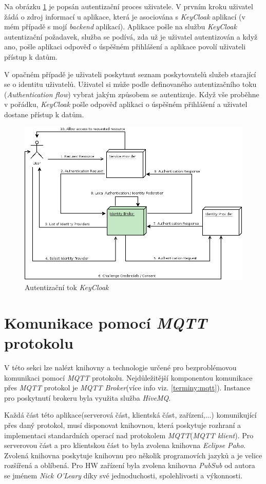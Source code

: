 Na obrázku \ref{figure:keycloak_flow} je popsán autentizační proces uživatele. V prvním kroku uživatel žádá o zdroj informací u aplikace, která je asociována s \emph{KeyCloak} aplikací (v mém případě s mojí \emph{backend} aplikací).
Aplikace pošle na službu \emph{KeyCloak} autentizační požadavek, služba se podívá, zda už je uživatel autentizován a když ano, pošle aplikaci odpověď o úspěšném přihlášení a aplikace povolí uživateli přístup k datům.

V opačném případě je uživateli poskytnut seznam poskytovatelů služeb starající se o identitu uživatelů.
Uživatel si může podle definovaného autentizačního toku (\emph{Authentication flow}) vybrat jakým způsobem se autentizuje. Když vše proběhne v pořádku, \emph{KeyCloak} pošle odpověď aplikaci o úspěšném přihlášení a uživatel dostane přístup k datům.

\begin{figure}[hbt]
  \centering
  \includegraphics[width=.8 \linewidth]{obrazky-figures/keycloak_flow.png}
  \caption{Autentizační tok \emph{KeyCloak}}
  \label{figure:keycloak_flow}
\end{figure}

\section{Komunikace pomocí \emph{MQTT} protokolu}
\label{pouzite:mqtt}

V této sekci lze nalézt knihovny a technologie určené pro bezproblémovou komunikaci pomocí \emph{MQTT} protokolu.
Nejdůležitější komponentou komunikace přes \emph{MQTT} protokol je \emph{MQTT Broker}(více info viz. \ref{terminy:mqtt}).
Instance pro poskytnutí brokeru byla využita služba \emph{HiveMQ}.

Každá část této aplikace(serverová část, klientská část, zařízení,...) komunikující přes daný protokol, musí disponovat knihovnou, která poskytuje rozhraní a implementaci standardních operací nad protokolem \emph{MQTT}(\emph{MQTT klient}).
Pro serverovou část a pro klientskou část to byla zvolena knihovna \emph{Eclipse Paho}.
Zvolená knihovna poskytuje knihovnu pro několik programovích jazyků a je velice rozšířená a oblíbená.
Pro HW zařízení byla zvolena knihovna \emph{PubSub} od autora se jménem \emph{Nick O'Leary} díky své jednoduchosti, spolehlivosti a výkonnosti.

